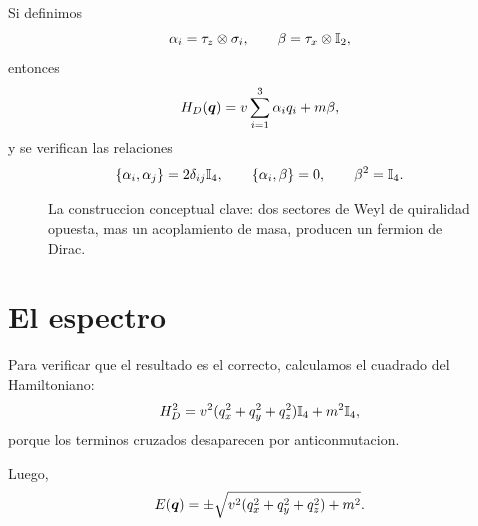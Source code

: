 Si definimos
\begin{equation}
\alpha_i=\tau_z\otimes \sigma_i,
\qquad
\beta=\tau_x\otimes \mathbb{I}_2,
\end{equation}
entonces
\begin{equation}
H_D(\bm{q})= v\sum_{i=1}^3 \alpha_i q_i + m\beta,
\end{equation}
y se verifican las relaciones
\begin{equation}
\{\alpha_i,\alpha_j\}=2\delta_{ij}\mathbb{I}_4,
\qquad
\{\alpha_i,\beta\}=0,
\qquad
\beta^2=\mathbb{I}_4.
\label{c07:eq:dirac-clifford}
\end{equation}

\begin{figure}[ht]
\centering
{}
\caption{La construccion conceptual clave: dos sectores de Weyl de quiralidad opuesta, mas un acoplamiento de masa, producen un fermion de Dirac.}
\label{c07:fig:weyl-to-dirac}
\end{figure}

\section{El espectro}

Para verificar que el resultado es el correcto, calculamos el cuadrado del Hamiltoniano:
\begin{equation}
H_D^2 =
v^2(q_x^2+q_y^2+q_z^2)\mathbb{I}_4 + m^2\mathbb{I}_4,
\end{equation}
porque los terminos cruzados desaparecen por anticonmutacion.

Luego,
\begin{equation}
E(\bm{q})=\pm \sqrt{v^2(q_x^2+q_y^2+q_z^2)+m^2}.
\label{c07:eq:dirac-spectrum}
\end{equation}

